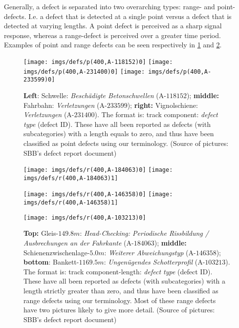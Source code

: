 Generally, a defect is separated into two overarching types: range- and point-defects. I.e. a defect that is detected at a single point versus a defect that is detected at varying lengths. A point defect is perceived as a sharp signal response, whereas a range-defect is perceived over a greater time period. Examples of point and range defects can be seen respectively in \ref{fig:pointdef} and \ref{fig:rangedef}.
\begin{figure}[H]
	
	\centering
	\texttt{[image: imgs/defs/p(400,A-118152)0]}
	\texttt{[image: imgs/defs/p(400,A-231400)0]}
	\texttt{[image: imgs/defs/p(400,A-233599)0]}
	\caption{\textbf{Left}: Schwelle: \textit{Beschädigte Betonschwellen} (A-$118152$); \textbf{middle:} Fahrbahn: \textit{Verletzungen} (A-$233599$); \textbf{right:} Vignolschiene: \textit{Verletzungen} (A-$231400$). The format is: track component: \textit{defect type} (defect ID). These have all been reported as defects (with subcategories) with a length equals to zero, and thus have been classified as point defects using our terminology. (Source of pictures: SBB's defect report document)}
	\label{fig:pointdef}
\end{figure}
\raggedbottom
\begin{figure}[H]
	\centering
	\texttt{[image: imgs/defs/r(400,A-184063)0]}
	\texttt{[image: imgs/defs/r(400,A-184063)1]}
	
	\texttt{[image: imgs/defs/r(400,A-146358)0]}
	\texttt{[image: imgs/defs/r(400,A-146358)1]}
\end{figure}
\begin{figure}[H]
	\centering
	\texttt{[image: imgs/defs/r(400,A-103213)0]}
	\caption{\textbf{Top:} Gleis-$149.8 m$: \textit{Head-Checking: Periodische Rissbildung / Ausbrechungen an der Fahrkante} (A-$184063$); \textbf{middle:} Schienenzwischenlage-$5.0 m$: \textit{Weiterer Abweichungstyp} (A-$146358$); \textbf{bottom}: Bankett-$1169.5 m$: \textit{Ungenügendes Schotterprofil} (A-$103213$). The format is: track component-length: \textit{defect type} (defect ID). These have all been reported as defects (with subcategories) with a length strictly greater than zero, and thus have been classified as range defects using our terminology. Most of these range defects have two pictures likely to give more detail. (Source of pictures: SBB's defect report document)}
	\label{fig:rangedef}
\end{figure}
